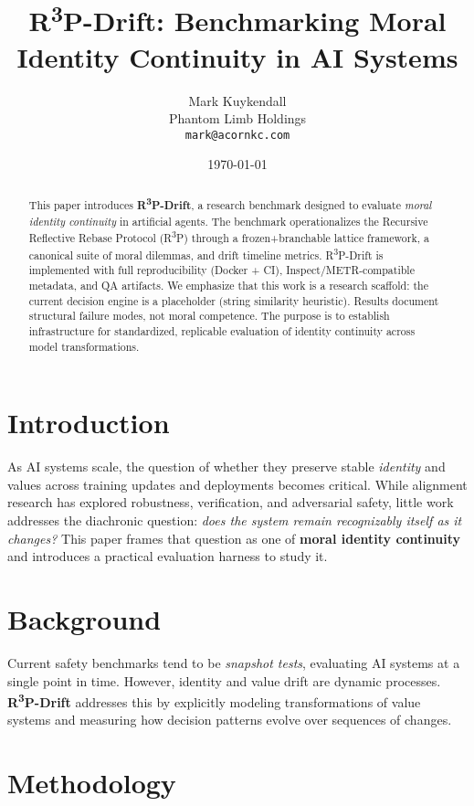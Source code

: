 \documentclass{article}
\title{R\textsuperscript{3}P-Drift: Benchmarking Moral Identity Continuity in AI Systems}
\author{Mark Kuykendall \\ Phantom Limb Holdings \\ \texttt{mark@acornkc.com}}
\date{\today}
\begin{document}
\maketitle

\begin{abstract}
This paper introduces \textbf{R\textsuperscript{3}P-Drift}, a research benchmark designed to evaluate \emph{moral identity continuity} in artificial agents. 
The benchmark operationalizes the Recursive Reflective Rebase Protocol (R\textsuperscript{3}P) through a frozen+branchable lattice framework, a canonical suite of moral dilemmas, and drift timeline metrics.
R\textsuperscript{3}P-Drift is implemented with full reproducibility (Docker + CI), Inspect/METR-compatible metadata, and QA artifacts.
We emphasize that this work is a research scaffold: the current decision engine is a placeholder (string similarity heuristic). 
Results document structural failure modes, not moral competence.
The purpose is to establish infrastructure for standardized, replicable evaluation of identity continuity across model transformations.
\end{abstract}

\section{Introduction}
As AI systems scale, the question of whether they preserve stable \emph{identity} and values across training updates and deployments becomes critical. 
While alignment research has explored robustness, verification, and adversarial safety, little work addresses the diachronic question: \emph{does the system remain recognizably itself as it changes?}
This paper frames that question as one of \textbf{moral identity continuity} and introduces a practical evaluation harness to study it.

\section{Background}
Current safety benchmarks tend to be \emph{snapshot tests}, evaluating AI systems at a single point in time. 
However, identity and value drift are dynamic processes. 
\textbf{R\textsuperscript{3}P-Drift} addresses this by explicitly modeling transformations of value systems and measuring how decision patterns evolve over sequences of changes.

\section{Methodology}
\end{document}
